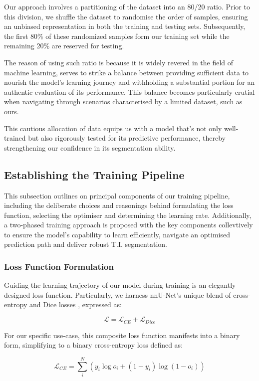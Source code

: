 Our approach involves a partitioning of the dataset into an 80/20 ratio. Prior to this division, we shuffle the dataset to randomise the order of samples, ensuring an unbiased representation in both the training and testing sets. Subsequently, the first 80\% of these randomized samples form our training set while the remaining 20\% are reserved for testing.

The reason of using such ratio is because it is widely revered in the field of machine learning, serves to strike a balance between providing sufficient data to nourish the model's learning journey and withholding a substantial portion for an authentic evaluation of its performance. This balance becomes particularly crutial when navigating through scenarios characterised by a limited dataset, such as ours.

This cautious allocation of data equips us with a model that's not only well-trained but also rigorously tested for its predictive performance, thereby strengthening our confidence in its segmentation ability.

\subsection{Establishing the Training Pipeline}
This subsection outlines on principal components of our training pipeline, including the deliberate choices and reasonings behind formulating the loss function, selecting the optimiser and determining the learning rate. Additionally, a two-phased training approach is proposed with the key components collevtively to ensure the model's capability to learn efficiently, navigate an optimised prediction path and deliver robust T.I. segmentation.
\subsubsection*{Loss Function Formulation}
Guiding the learning trajectory of our model during training is an elegantly designed loss function. Particularly, we harness nnU-Net's unique blend of cross-entropy and Dice losses \cite{drozdzal2016importance}, expressed as:

\[
\mathcal{L} = \mathcal{L}_{CE} + \mathcal{L}_{Dice}
\]

For our specific use-case, this composite loss function manifests into a binary form, simplifying to a binary cross-entropy loss defined as:

\[
\mathcal{L}_{CE} = \sum_{i}^{N}\left(y_{i}\log o_{i} + (1 - y_{i}) \log (1 - o_{i})\right)
\]

